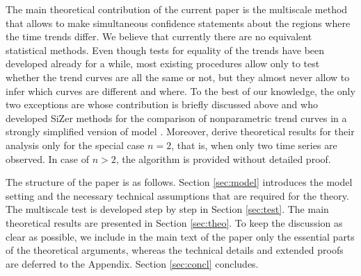 \documentclass[a4paper,12pt]{article}
\makeatletter
\renewcommand{\eqref}[1]{\tagform@{\ref{#1}}}
\makeatother
\begin{document}


The main theoretical contribution of the current paper is the multiscale method that allows to make simultaneous confidence statements about the regions where the time trends differ. We believe that currently there are no equivalent statistical methods. Even though tests for equality of the trends have been developed already for a while, most existing procedures allow only to test whether the trend curves are all the same or not, but they almost never allow to infer which curves are different and where. To the best of our knowledge, the only two exceptions are \cite{KhismatullinaVogt2021} whose contribution is briefly discussed above and \cite{Park2009} who developed SiZer methods for the comparison of nonparametric trend curves in a strongly simplified version of \linebreak model \eqref{eq:model}. Moreover, \cite{Park2009} derive theoretical results for their analysis only for the special case $n=2$, that is, when only two time series are observed. In case of $n>2$, the algorithm is provided without detailed proof.

The structure of the paper is as follows. Section \ref{sec:model} introduces the model setting and the necessary technical assumptions that are required for the theory. The multiscale test is developed step by step in Section \ref{sec:test}. The main theoretical results are presented in Section \ref{sec:theo}. To keep the discussion as clear as possible, we include in the main text of the paper only the essential parts of the theoretical arguments, whereas the technical details and extended proofs are deferred to the Appendix. Section \ref{sec:concl} concludes.
\end{document}
